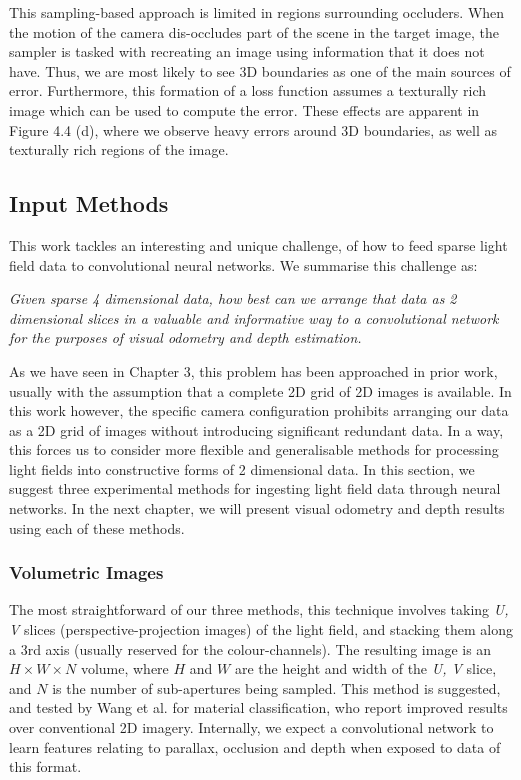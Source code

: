 This sampling-based approach is limited in regions surrounding occluders. When the motion of the camera dis-occludes part of the scene in the target image, the sampler is tasked with recreating an image using information that it does not have. Thus, we are most likely to see 3D boundaries as one of the main sources of error. Furthermore, this formation of a loss function assumes a texturally rich image which can be used to compute the error. These effects are apparent in Figure 4.4 (d), where we observe heavy errors around 3D boundaries, as well as texturally rich regions of the image.


\subsection{Input Methods}

This work tackles an interesting and unique challenge, of how to feed sparse light field data to convolutional neural networks. We summarise this challenge as:

\textit{Given sparse 4 dimensional data, how best can we arrange that data as 2 dimensional slices in a valuable and informative way to a convolutional network for the purposes of visual odometry and depth estimation.}

As we have seen in Chapter 3, this problem has been approached in prior work, usually with the assumption that a complete 2D grid of 2D images is available. In this work however, the specific camera configuration prohibits arranging our data as a 2D grid of images without introducing significant redundant data. In a way, this forces us to consider more flexible and generalisable methods for processing light fields into constructive forms of 2 dimensional data. In this section, we suggest three experimental methods for ingesting light field data through neural networks. In the next chapter, we will present visual odometry and depth results using each of these methods.

\subsubsection{Volumetric Images}
The most straightforward of our three methods, this technique involves taking \textit{U, V} slices (perspective-projection images) of the light field, and stacking them along a 3rd axis (usually reserved for the colour-channels). The resulting image is an $H \times W \times N$ volume, where $H$ and $W$ are the height and width of the \textit{U, V} slice, and $N$ is the number of sub-apertures being sampled. This method is suggested, and tested by Wang et al. \cite{wang2016lfcnn} for material classification, who report improved results over conventional 2D imagery. Internally, we expect a convolutional network to learn features relating to parallax, occlusion and depth when exposed to data of this format.

